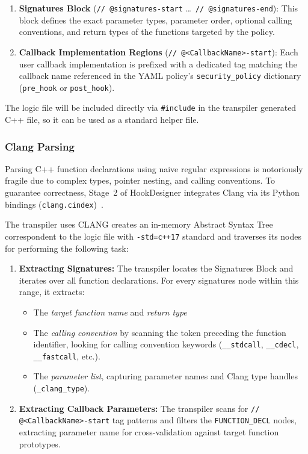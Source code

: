 \begin{enumerate}
	\item \textbf{Signatures Block} (\texttt{// @signatures-start} \dots\ \texttt{// @signatures-end}): 
	This block defines the exact parameter types, parameter order, optional calling conventions, and return types of the functions targeted by the policy.
	\item \textbf{Callback Implementation Regions} (\texttt{// @<CallbackName>-start}): 
	Each user callback implementation is prefixed with a dedicated tag matching the callback name referenced in the YAML policy's \texttt{security\_policy} dictionary (\texttt{pre\_hook} or \texttt{post\_hook}).
\end{enumerate}

The logic file will be included directly via \texttt{\#include} in the transpiler generated C++ file, so it can be used as a standard helper file.

\subsubsection{Clang Parsing}
\label{subsec:libclang_ast}

Parsing C++ function declarations using naive regular expressions is notoriously fragile due to complex types, pointer nesting, and calling conventions.
To guarantee correctness, Stage~2 of HookDesigner integrates Clang via its Python bindings (\texttt{clang.cindex})~\cite{tool:clang}.

The transpiler uses CLANG creates an in-memory Abstract Syntax Tree correspondent to the logic file with \texttt{-std=c++17} standard and traverses its nodes for performing the following task:

\begin{enumerate}
	\item \textbf{Extracting Signatures:} 
	The transpiler locates the Signatures Block and iterates over all function declarations. For every signatures node within this range, it extracts:
	\begin{itemize}
		\item The \emph{target function name} and \emph{return type}
		\item The \emph{calling convention} by scanning the token preceding the function identifier, looking for calling convention keywords (\texttt{\_\_stdcall}, \texttt{\_\_cdecl}, \texttt{\_\_fastcall}, etc.).
		\item The \emph{parameter list}, capturing parameter names and Clang type handles (\texttt{\_clang\_type}).
	\end{itemize}
	\item \textbf{Extracting Callback Parameters:}
	The transpiler scans for \texttt{// @<CallbackName>-}\allowbreak\texttt{start} tag patterns and filters the \texttt{FUNCTION\_DECL} nodes, extracting parameter name for cross-validation against target function prototypes.
\end{enumerate}

